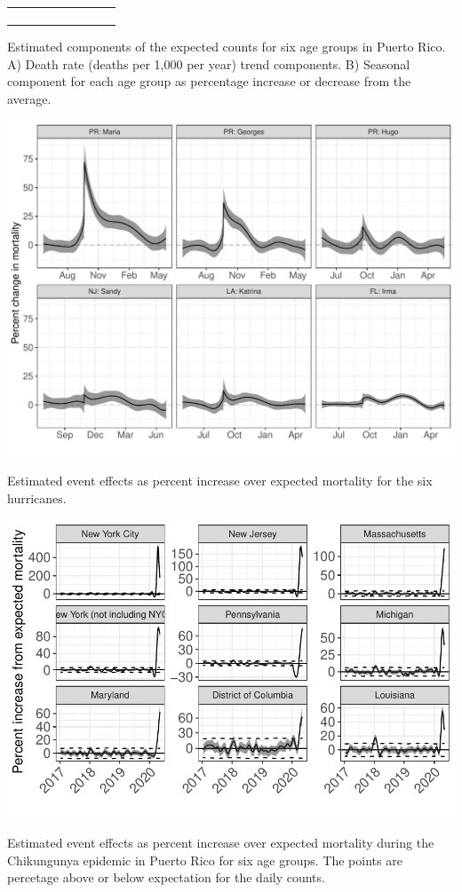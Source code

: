 \documentclass[11pt]{article}
\begin{document}
\begin{suppfigure}[ht]
\begin{tabular}{lll}
\begin{subfigure}[t]{0.49\linewidth}
	\end{subfigure}&\\
    \end{tabular}
    \caption{Estimated components of the expected counts for six age groups in Puerto Rico. A) Death rate (deaths per 1,000 per year) trend components. B) Seasonal component for each age group as percentage increase or decrease from the average.}
    \label{supp-fig:model-components}
\end{suppfigure}

\begin{suppfigure}[ht]
	\centering
	\includegraphics[width=1\linewidth]{figs/supp-figure-3.pdf} 
    \caption{Estimated event effects as percent increase over expected mortality for the six hurricanes.}
	\label{supp-fig:hurricane-effects}
\end{suppfigure}

\begin{suppfigure}[ht]
	\centering
	\includegraphics[width=1\linewidth]{figs/supp-figure-4.pdf} 
    \caption{Estimated event effects as percent increase over expected mortality during the Chikungunya epidemic in Puerto Rico for six age groups. The points are percetage above or below expectation for the daily counts.}
	\label{supp-fig:chikungunya-agegroups}
\end{suppfigure}
\end{document}
